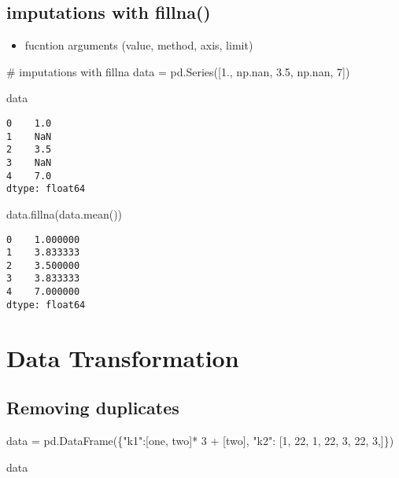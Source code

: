 \documentclass[
  letterpaper,
  DIV=11,
  numbers=noendperiod]{scrreprt}
\newenvironment{Shaded}{\begin{snugshade}}{\end{snugshade}}
\newcommand{\CommentTok}[1]{\textcolor[rgb]{0.37,0.37,0.37}{#1}}
\newcommand{\DecValTok}[1]{\textcolor[rgb]{0.68,0.00,0.00}{#1}}
\newcommand{\FloatTok}[1]{\textcolor[rgb]{0.68,0.00,0.00}{#1}}
\newcommand{\NormalTok}[1]{\textcolor[rgb]{0.00,0.23,0.31}{#1}}
\newcommand{\OperatorTok}[1]{\textcolor[rgb]{0.37,0.37,0.37}{#1}}
\newcommand{\StringTok}[1]{\textcolor[rgb]{0.13,0.47,0.30}{#1}}
\providecommand{\tightlist}{%
  \setlength{\itemsep}{0pt}\setlength{\parskip}{0pt}}\usepackage{longtable,booktabs,array}
\begin{document}
\hypertarget{imputations-with-fillna}{%
\section{imputations with fillna()}\label{imputations-with-fillna}}

\begin{itemize}
\tightlist
\item
  fucntion arguments (value, method, axis, limit)
\end{itemize}

\begin{Shaded}
\begin{Highlighting}[]
\CommentTok{\# imputations with fillna}
\NormalTok{data }\OperatorTok{=}\NormalTok{ pd.Series([}\FloatTok{1.}\NormalTok{, np.nan, }\FloatTok{3.5}\NormalTok{, np.nan, }\DecValTok{7}\NormalTok{])}

\NormalTok{data}
\end{Highlighting}
\end{Shaded}

\begin{verbatim}
0    1.0
1    NaN
2    3.5
3    NaN
4    7.0
dtype: float64
\end{verbatim}

\begin{Shaded}
\begin{Highlighting}[]
\NormalTok{data.fillna(data.mean())}
\end{Highlighting}
\end{Shaded}

\begin{verbatim}
0    1.000000
1    3.833333
2    3.500000
3    3.833333
4    7.000000
dtype: float64
\end{verbatim}

\hypertarget{data-transformation-1}{%
\chapter{Data Transformation}\label{data-transformation-1}}

\hypertarget{removing-duplicates}{%
\section{Removing duplicates}\label{removing-duplicates}}

\begin{Shaded}
\begin{Highlighting}[]
\NormalTok{data }\OperatorTok{=}\NormalTok{ pd.DataFrame(\{}\StringTok{"k1"}\NormalTok{:[}\StringTok{\textquotesingle{}one\textquotesingle{}}\NormalTok{, }\StringTok{\textquotesingle{}two\textquotesingle{}}\NormalTok{]}\OperatorTok{*} \DecValTok{3} \OperatorTok{+}\NormalTok{ [}\StringTok{\textquotesingle{}two\textquotesingle{}}\NormalTok{],}
                   \StringTok{"k2"}\NormalTok{: [}\DecValTok{1}\NormalTok{, }\DecValTok{22}\NormalTok{, }\DecValTok{1}\NormalTok{, }\DecValTok{22}\NormalTok{, }\DecValTok{3}\NormalTok{, }\DecValTok{22}\NormalTok{, }\DecValTok{3}\NormalTok{,]\})}

\NormalTok{data}
\end{Highlighting}
\end{Shaded}
\end{document}
